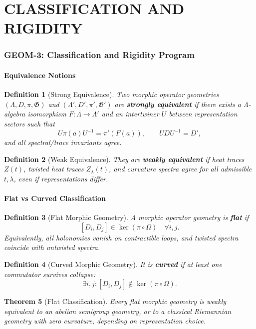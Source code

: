 \documentclass[12pt, oneside]{article}
\newtheorem{theorem}{Theorem}[section]
\newtheorem{definition}[theorem]{Definition}
\begin{document}
\part{CLASSIFICATION AND RIGIDITY}

\section{GEOM-3: Classification and Rigidity Program}

\subsection{Equivalence Notions}

\begin{definition}[Strong Equivalence]
Two morphic operator geometries $(\Lambda, D, \pi, \mathfrak{G})$ and $(\Lambda', D', \pi', \mathfrak{G}')$ are \textbf{strongly equivalent} if there exists a Λ-algebra isomorphism $F: \Lambda \to \Lambda'$ and an intertwiner $U$ between representation sectors such that
\[
U \pi(a) U^{-1} = \pi'(F(a)), \qquad U D U^{-1} = D',
\]
and all spectral/trace invariants agree.
\end{definition}

\begin{definition}[Weak Equivalence]
They are \textbf{weakly equivalent} if heat traces $Z(t)$, twisted heat traces $Z_\lambda(t)$, and curvature spectra agree for all admissible $t,\lambda$, even if representations differ.
\end{definition}

\subsection{Flat vs Curved Classification}

\begin{definition}[Flat Morphic Geometry]
A morphic operator geometry is \textbf{flat} if
\[
[D_i, D_j] \in \ker(\pi \circ \Omega) \quad \forall i,j.
\]
Equivalently, all holonomies vanish on contractible loops, and twisted spectra coincide with untwisted spectra.
\end{definition}

\begin{definition}[Curved Morphic Geometry]
It is \textbf{curved} if at least one commutator survives collapse:
\[
\exists i,j : [D_i, D_j] \notin \ker(\pi \circ \Omega).
\]
\end{definition}

\begin{theorem}[Flat Classification]
Every flat morphic geometry is weakly equivalent to an abelian semigroup geometry, or to a classical Riemannian geometry with zero curvature, depending on representation choice.
\end{theorem}
\end{document}
